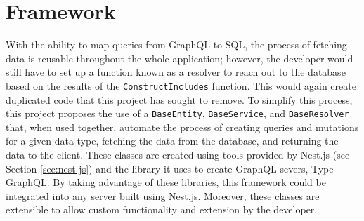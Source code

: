 \section{Framework}
With the ability to map queries from GraphQL to SQL, the process of fetching data is reusable throughout the whole application; however, the developer would still have to set up a function known as a resolver to reach out to the database based on the results of the \verb!ConstructIncludes! function.  This would again create duplicated code that this project has sought to remove.  To simplify this process, this project proposes the use of a \verb!BaseEntity!, \verb!BaseService!, and \verb!BaseResolver! that, when used together, automate the process of creating queries and mutations for a given data type, fetching the data from the database, and returning the data to the client.  These classes are created using tools provided by Nest.js (see Section \ref{sec:nest-js}) and the library it uses to create GraphQL severs, Type-GraphQL.  By taking advantage of these libraries, this framework could be integrated into any server built using Nest.js.  Moreover, these classes are extensible to allow custom functionality and extension by the developer.









